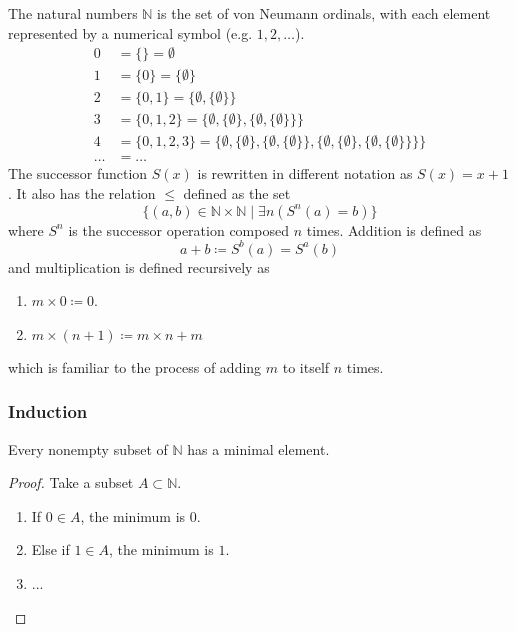     \begin{definition}
      The natural numbers $\mathbb{N}$ is the set of von Neumann ordinals, with each element represented by a numerical symbol (e.g. $1, 2, \ldots$). 
      \begin{align*}
        0 & = \{\} = \emptyset \\
        1 & = \{0\} = \{\emptyset\} \\
        2 & = \{0,1\} = \{\emptyset,\{\emptyset\}\} \\
        3 & = \{0,1,2\} = \{\emptyset,\{\emptyset\},\{\emptyset,\{\emptyset\}\}\} \\
        4 & = \{0,1,2,3\} = \{\emptyset,\{\emptyset\},\{\emptyset,\{\emptyset\}\},\{\emptyset,\{\emptyset\},\{\emptyset,\{\emptyset\}\}\}\} \\
        \ldots & = \ldots 
      \end{align*} 
      The successor function $S(x)$ is rewritten in different notation as $S(x) = x + 1$. It also has the relation $\leq$ defined as the set
      \begin{equation}
        \{ (a, b) \in \mathbb{N} \times \mathbb{N} \mid \exists n (S^n(a) = b )\}
      \end{equation}
      where $S^n$ is the successor operation composed $n$ times. Addition is defined as 
      \begin{equation}
        a + b \coloneqq S^b (a) = S^a (b)
      \end{equation}
      and multiplication is defined recursively as 
      \begin{enumerate}
        \item $m \times 0 \coloneqq 0$. 
        \item $m \times (n + 1) \coloneqq m \times n + m$
      \end{enumerate}
      which is familiar to the process of adding $m$ to itself $n$ times. 
    \end{definition} 

  \subsubsection{Induction}

    \begin{lemma}
      Every nonempty subset of $\mathbb{N}$ has a minimal element. 
    \end{lemma} 
    \begin{proof}
      Take a subset $A \subset \mathbb{N}$. 
      \begin{enumerate}
        \item If $0 \in A$, the minimum is $0$. 
        \item Else if $1 \in A$, the minimum is $1$. 
        \item ...
      \end{enumerate} 
    \end{proof}

